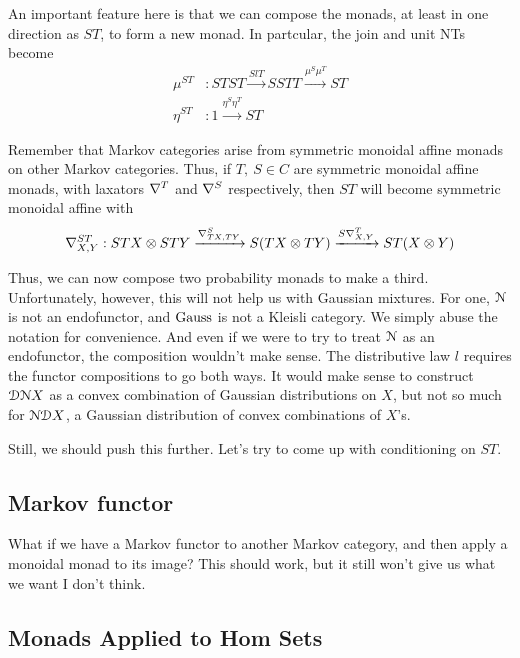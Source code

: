 An important feature here is that we can compose the monads, at least in one direction as $ST$, to form a new monad.
In partcular, the join and unit NTs become
\begin{align}
    \mu^{ST} &: STST \xrightarrow{SlT} SSTT \xrightarrow{\mu^S \mu^T} ST\\
    \eta^{ST} &: 1\xrightarrow{\eta^S\eta^T}ST
\end{align}

Remember that Markov categories arise from symmetric monoidal affine monads on other Markov categories.
Thus, if $T,\ S\in C$ are symmetric monoidal affine monads, with laxators $\nabla^T$ and $\nabla^S$ respectively, then $ST$ will become symmetric monoidal affine with
\begin{equation}
    \nabla^{ST}_{X,Y} : STX \otimes STY \xrightarrow{\nabla^S_{TX,TY}}
    S(TX\otimes TY) \xrightarrow{S\nabla^T_{X,Y}} ST(X\otimes Y)
\end{equation}

Thus, we can now compose two probability monads to make a third.
Unfortunately, however, this will not help us with Gaussian mixtures.
For one, $\mathcal{N}$ is not an endofunctor, and $\mathrm{Gauss}$ is not a Kleisli category.
We simply abuse the notation for convenience.
And even if we were to try to treat $\mathcal{N}$ as an endofunctor, the composition wouldn't make sense.
The distributive law $l$ requires the functor compositions to go both ways. 
It would make sense to construct $\mathcal{D}\mathcal{N} X$ as a convex combination of Gaussian distributions on $X$, but not so much for $\mathcal{N} \mathcal{D} X$, a Gaussian distribution of convex combinations of $X$'s.

Still, we should push this further. Let's try to come up with conditioning on $ST$.

\subsection{Markov functor}

What if we have a Markov functor to another Markov category, and then apply a monoidal monad to its image?
This should work, but it still won't give us what we want I don't think.

\subsection{Monads Applied to Hom Sets}

